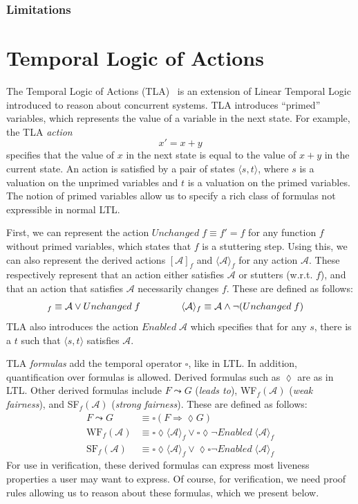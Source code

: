 \documentclass{llncs}
\begin{document}
\subsubsection{Limitations}
%
\section{Temporal Logic of Actions}
The Temporal Logic of Actions (TLA)~\cite{tla-lamport} is an extension of Linear Temporal
Logic introduced to reason about concurrent systems. TLA introduces ``primed''
variables, which represents the value of a variable in the next state. For
example, the TLA \textit{action} $$x' = x + y$$ specifies that the value of $x$
in the next state is equal to the value of $x + y$ in the current state. An
action is satisfied by a pair of states $\langle s, t \rangle$, where $s$ is a
valuation on the unprimed variables and $t$ is a valuation on the primed
variables. The notion of primed variables allow us to specify a rich class of
formulas not expressible in normal LTL.

First, we can represent the action $Unchanged\;f \equiv f' = f$ for any 
function $f$  without primed variables, which states that $f$ is a
stuttering step. Using this, we can also represent the derived actions
$[\mathcal A]_f$ and $\langle \mathcal A \rangle_f$ for any action
$\mathcal A$. These respectively represent that an action either satisfies $\mathcal A$ or
stutters (w.r.t. $f$), and that an action that satisfies $\mathcal A$
necessarily changes $f$. These are defined as follows:
\begin{align*}
  [\mathcal A]_f \equiv \mathcal A \vee Unchanged\;f \hspace{1.5cm}
  & \langle \mathcal A \rangle_f \equiv \mathcal A \wedge \neg(Unchanged\;f)
\end{align*}
TLA also introduces the action $Enabled\;\mathcal A$ which specifies that for
any $s$, there is a $t$ such that $\langle s, t \rangle$ satisfies $\mathcal A$.

TLA \textit{formulas} add the temporal operator $\square$, like in LTL. In
addition, quantification over formulas is allowed. Derived formulas such as
$\lozenge$ are as in LTL. Other derived formulas include $F \leadsto G$
(\textit{leads to}), WF$_f(\mathcal A)$ (\textit{weak fairness}), and
SF$_f(\mathcal A)$ (\textit{strong fairness}). These are defined as follows:
\begin{align*}
  F \leadsto G &\equiv \square(F \Rightarrow \lozenge G) \\
  \text{WF}_f(\mathcal A) &\equiv \square\lozenge\langle\mathcal A\rangle_f \vee \square\lozenge\neg Enabled\;\langle\mathcal A\rangle_f \\
  \text{SF}_f(\mathcal A) &\equiv \square\lozenge\langle\mathcal A\rangle_f \vee \lozenge\square\neg Enabled\;\langle\mathcal A\rangle_f
\end{align*}
For use in verification, these derived formulas can express most liveness
properties a user may want to express. Of course, for verification, we need
proof rules allowing us to reason about these formulas, which we present below.
\end{document}

